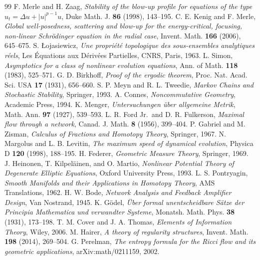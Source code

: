 \begin{thebibliography}{99}
 F. Merle and H. Zaag, \emph{Stability of the blow-up profile for equations of the type $u_t = \Delta u + |u|^{p-1}u$}, Duke Math. J. \textbf{86} (1998), 143--195.
 C. E. Kenig and F. Merle, \emph{Global well-posedness, scattering and blow-up for the energy-critical, focusing, non-linear Schr\"odinger equation in the radial case}, Invent. Math. \textbf{166} (2006), 645--675.
 S. \L ojasiewicz, \emph{Une propri\'et\'e topologique des sous-ensembles analytiques r\'eels}, Les \'Equations aux D\'eriv\'ees Partielles, CNRS, Paris, 1963.
 L. Simon, \emph{Asymptotics for a class of nonlinear evolution equations}, Ann. of Math. \textbf{118} (1983), 525--571.
 G. D. Birkhoff, \emph{Proof of the ergodic theorem}, Proc. Nat. Acad. Sci. USA \textbf{17} (1931), 656--660.
 S. P. Meyn and R. L. Tweedie, \emph{Markov Chains and Stochastic Stability}, Springer, 1993.
 A. Connes, \emph{Noncommutative Geometry}, Academic Press, 1994.
 K. Menger, \emph{Untersuchungen \"uber allgemeine Metrik}, Math. Ann. \textbf{97} (1927), 539--593.
 L. R. Ford Jr.\ and D. R. Fulkerson, \emph{Maximal flow through a network}, Canad. J. Math. \textbf{8} (1956), 399--404.
 P. Gabriel and M. Zisman, \emph{Calculus of Fractions and Homotopy Theory}, Springer, 1967.
 N. Margolus and L. B. Levitin, \emph{The maximum speed of dynamical evolution}, Physica D \textbf{120} (1998), 188--195.
 H. Federer, \emph{Geometric Measure Theory}, Springer, 1969.
 J. Heinonen, T. Kilpel\"ainen, and O. Martio, \emph{Nonlinear Potential Theory of Degenerate Elliptic Equations}, Oxford University Press, 1993.
 L. S. Pontryagin, \emph{Smooth Manifolds and their Applications in Homotopy Theory}, AMS Translations, 1962.
 H. W. Bode, \emph{Network Analysis and Feedback Amplifier Design}, Van Nostrand, 1945.
 K. G\"odel, \emph{\"Uber formal unentscheidbare S\"atze der Principia Mathematica und verwandter Systeme}, Monatsh. Math. Phys. \textbf{38} (1931), 173--198.
 T. M. Cover and J. A. Thomas, \emph{Elements of Information Theory}, Wiley, 2006.
 M. Hairer, \emph{A theory of regularity structures}, Invent. Math. \textbf{198} (2014), 269--504.
 G. Perelman, \emph{The entropy formula for the Ricci flow and its geometric applications}, arXiv:math/0211159, 2002.

\end{thebibliography}
